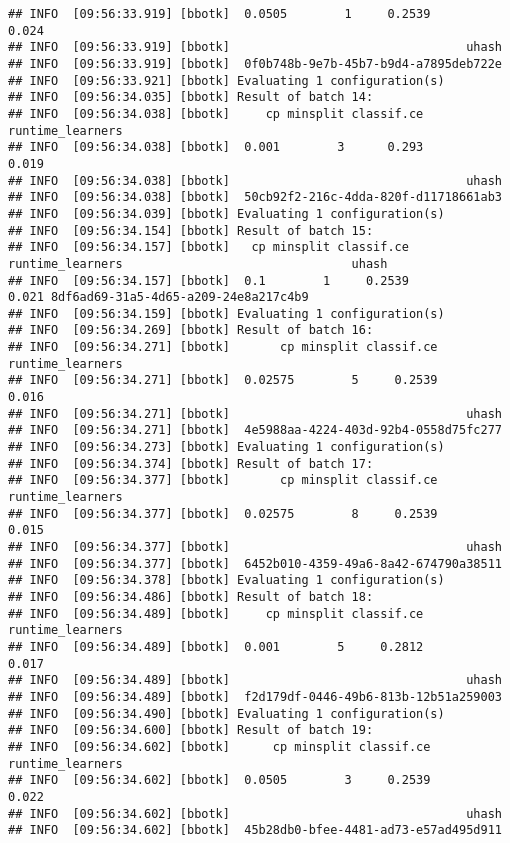 \documentclass[
]{scrbook}
\begin{document}
\begin{verbatim}
## INFO  [09:56:33.919] [bbotk]  0.0505        1     0.2539            0.024 
## INFO  [09:56:33.919] [bbotk]                                 uhash 
## INFO  [09:56:33.919] [bbotk]  0f0b748b-9e7b-45b7-b9d4-a7895deb722e 
## INFO  [09:56:33.921] [bbotk] Evaluating 1 configuration(s) 
## INFO  [09:56:34.035] [bbotk] Result of batch 14: 
## INFO  [09:56:34.038] [bbotk]     cp minsplit classif.ce runtime_learners 
## INFO  [09:56:34.038] [bbotk]  0.001        3      0.293            0.019 
## INFO  [09:56:34.038] [bbotk]                                 uhash 
## INFO  [09:56:34.038] [bbotk]  50cb92f2-216c-4dda-820f-d11718661ab3 
## INFO  [09:56:34.039] [bbotk] Evaluating 1 configuration(s) 
## INFO  [09:56:34.154] [bbotk] Result of batch 15: 
## INFO  [09:56:34.157] [bbotk]   cp minsplit classif.ce runtime_learners                                uhash 
## INFO  [09:56:34.157] [bbotk]  0.1        1     0.2539            0.021 8df6ad69-31a5-4d65-a209-24e8a217c4b9 
## INFO  [09:56:34.159] [bbotk] Evaluating 1 configuration(s) 
## INFO  [09:56:34.269] [bbotk] Result of batch 16: 
## INFO  [09:56:34.271] [bbotk]       cp minsplit classif.ce runtime_learners 
## INFO  [09:56:34.271] [bbotk]  0.02575        5     0.2539            0.016 
## INFO  [09:56:34.271] [bbotk]                                 uhash 
## INFO  [09:56:34.271] [bbotk]  4e5988aa-4224-403d-92b4-0558d75fc277 
## INFO  [09:56:34.273] [bbotk] Evaluating 1 configuration(s) 
## INFO  [09:56:34.374] [bbotk] Result of batch 17: 
## INFO  [09:56:34.377] [bbotk]       cp minsplit classif.ce runtime_learners 
## INFO  [09:56:34.377] [bbotk]  0.02575        8     0.2539            0.015 
## INFO  [09:56:34.377] [bbotk]                                 uhash 
## INFO  [09:56:34.377] [bbotk]  6452b010-4359-49a6-8a42-674790a38511 
## INFO  [09:56:34.378] [bbotk] Evaluating 1 configuration(s) 
## INFO  [09:56:34.486] [bbotk] Result of batch 18: 
## INFO  [09:56:34.489] [bbotk]     cp minsplit classif.ce runtime_learners 
## INFO  [09:56:34.489] [bbotk]  0.001        5     0.2812            0.017 
## INFO  [09:56:34.489] [bbotk]                                 uhash 
## INFO  [09:56:34.489] [bbotk]  f2d179df-0446-49b6-813b-12b51a259003 
## INFO  [09:56:34.490] [bbotk] Evaluating 1 configuration(s) 
## INFO  [09:56:34.600] [bbotk] Result of batch 19: 
## INFO  [09:56:34.602] [bbotk]      cp minsplit classif.ce runtime_learners 
## INFO  [09:56:34.602] [bbotk]  0.0505        3     0.2539            0.022 
## INFO  [09:56:34.602] [bbotk]                                 uhash 
## INFO  [09:56:34.602] [bbotk]  45b28db0-bfee-4481-ad73-e57ad495d911 

\end{verbatim}
\end{document}
